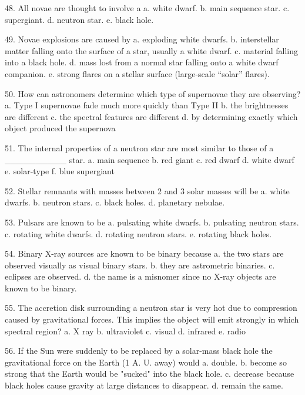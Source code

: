   48. All novae are thought to involve a
      a.  white dwarf.
      b.  main sequence star.
      c.  supergiant.
      d.  neutron star.
      e.  black hole.
      
  49. Novae explosions are caused by
      a.  exploding white dwarfs.
      b.  interstellar matter falling onto the surface of a star, usually a white dwarf.
      c.  material falling into a black hole.
      d.  mass lost from a normal star falling onto a white dwarf companion.
      e.  strong flares on a stellar surface (large-scale ``solar'' flares).
      
  50. How can astronomers determine which type of supernovae they
      are observing?
      a.  Type I supernovae fade much more quickly than Type II
      b.  the brightnesses are different
      c.  the spectral features are different
      d.  by determining exactly which object produced the supernova
      
 
  51. The internal properties of a neutron star are most similar to
      those of a __________ star.
      a.  main sequence
      b.  red giant
      c.  red dwarf
      d.  white dwarf
      e.  solar-type
      f.  blue supergiant
      
  52. Stellar remnants with masses between 2 and 3 solar masses will
      be
      a.  white dwarfs.
      b.  neutron stars.
      c.  black holes.
      d.  planetary nebulae.
      
  53. Pulsars are known to be
      a.  pulsating white dwarfs.
      b.  pulsating neutron stars.
      c.  rotating white dwarfs.
      d.  rotating neutron stars.
      e.  rotating black holes.
      
  54. Binary X-ray sources are known to be binary because
      a.  the two stars are observed visually as visual binary
          stars.
      b.  they are astrometric binaries.
      c.  eclipses are observed.
      d.  the name is a misnomer since no X-ray objects are known to
          be binary.
      
  55. The accretion disk surrounding a neutron star is very hot due
      to compression caused by gravitational forces. This implies
      the object will emit strongly in which spectral region?
      a.  X ray
      b.  ultraviolet
      c.  visual
      d.  infrared
      e.  radio
      
  56. If the Sun were suddenly to be replaced by a solar-mass black
      hole the gravitational force on the Earth (1 A. U. away) would
      a.  double.
      b.  become so strong that the Earth would be "sucked" into the
          black hole.
      c.  decrease because black holes cause gravity at large distances to disappear.
      d.  remain the same.
      
